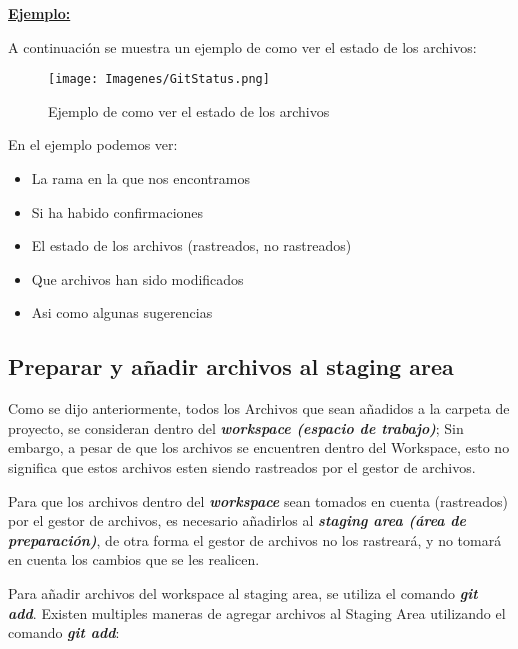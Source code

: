\textbf{\underline{Ejemplo:}}

A continuación se muestra un ejemplo de como ver el estado de los archivos:

    \begin{figure}[H]
        \centering
        \texttt{[image: Imagenes/GitStatus.png]}
        \caption{Ejemplo de como ver el estado de los archivos}
        \label{}
    \end{figure}

En el ejemplo podemos ver:

\begin{itemize}
    \item La rama en la que nos encontramos
    \item Si ha habido confirmaciones
    \item El estado de los archivos (rastreados, no rastreados)
    \item Que archivos han sido modificados
    \item Asi como algunas sugerencias
\end{itemize}

\subsection{Preparar y añadir archivos al staging area}

Como se dijo anteriormente, todos los Archivos que sean añadidos a la carpeta de proyecto, se consideran dentro del \textbf{\textit{workspace (espacio de trabajo)}}; Sin embargo, a pesar de que los archivos se encuentren dentro del Workspace, esto no significa que estos archivos esten siendo rastreados por el gestor de archivos.

Para que los archivos dentro del \textbf{\textit{workspace}} sean tomados en cuenta (rastreados) por el gestor de archivos, es necesario añadirlos al \textbf{\textit{staging area (área de preparación)}}, de otra forma el gestor de archivos no los rastreará, y no tomará en cuenta los cambios que se les realicen.

Para añadir archivos del workspace al staging area, se utiliza el comando \textbf{\textit{git add}}. Existen multiples maneras de agregar archivos al Staging Area utilizando el comando \textbf{\textit{git add}}:

